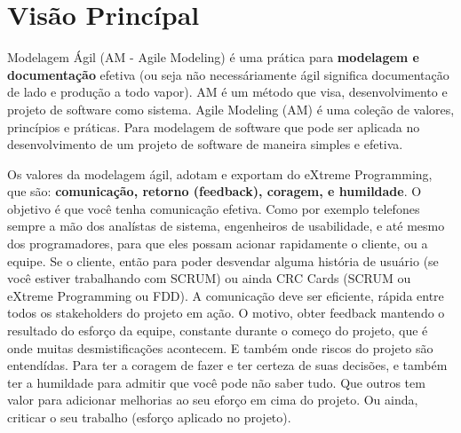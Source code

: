 \documentclass[conference]{IEEEtran}
\begin{document}
\section{Visão Princípal}
Modelagem Ágil (AM - Agile Modeling) é uma prática para {\bfseries modelagem e documentação} efetiva (ou seja não necessáriamente ágil significa documentação de lado e produção a todo vapor). AM é um método que visa, desenvolvimento e projeto de software como sistema. Agile Modeling (AM) é uma coleção de valores, princípios e práticas. Para modelagem de software que pode ser aplicada no desenvolvimento de um projeto de software de maneira simples e efetiva.

Os valores da modelagem ágil, adotam e exportam do eXtreme Programming, que são: {\bfseries comunicação, retorno (feedback), coragem, e humildade}. O objetivo é que você tenha comunicação efetiva. Como por exemplo telefones sempre a mão dos analístas de sistema, engenheiros de usabilidade, e até mesmo dos programadores, para que eles possam acionar rapidamente o cliente, ou a equipe. Se o cliente, então para poder desvendar alguma história de usuário (se você estiver trabalhando com SCRUM) ou ainda CRC Cards (SCRUM ou eXtreme Programming ou FDD). A comunicação deve ser eficiente, rápida entre todos os stakeholders do projeto em ação. O motivo, obter feedback mantendo o resultado do esforço da equipe, constante durante o começo do projeto, que é onde muitas desmistificações acontecem. E também onde riscos do projeto são entendídas. Para ter a coragem de fazer e ter certeza de suas decisões, e também ter a humildade para admitir que você pode não saber tudo. Que outros tem valor para adicionar melhorias ao seu eforço em cima do projeto. Ou ainda, criticar o seu trabalho (esforço aplicado no projeto).
\end{document}
